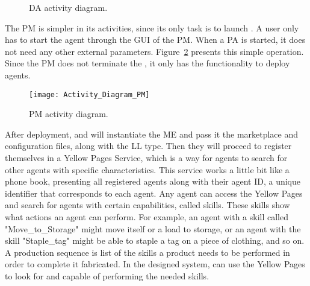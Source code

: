 \begin{figure}[h!]
	\centering
	\hspace{0.40cm}
	\caption{\acrlong{DA} activity diagram.}
	\label{fig:da_activity_diagrams}
\end{figure}

The \acrlong{PM} is simpler in its activities, since its only task is to launch . A user only has to start the agent through the \acrshort{GUI} of the \acrshort{PM}. When a \acrshort{PA} is started, it does not need any other external parameters. Figure~\ref{fig:pm_activity_diagram} presents this simple operation. Since the \acrshort{PM} does not terminate the , it only has the functionality to deploy agents.\\

\begin{figure}[h!]
	\centering
	\texttt{[image: Activity\_Diagram\_PM]}
	\caption{\acrlong{PM} activity diagram.}
	\label{fig:pm_activity_diagram}
\end{figure}

After deployment,  and  will instantiate the \acrlong{ME} and pass it the marketplace and configuration files, along with the \acrshort{LL} type. Then they will proceed to register themselves in a Yellow Pages Service, which is a way for agents to search for other agents with specific characteristics. This service works a little bit like a phone book, presenting all registered agents along with their agent ID, a unique identifier that corresponds to each agent. Any agent can access the Yellow Pages and search for agents with certain capabilities, called skills. These skills show what actions an agent can perform. For example, an agent with a skill called "Move\_to\_Storage" might move itself or a load to storage, or an agent with the skill "Staple\_tag" might be able to staple a tag on a piece of clothing, and so on. A production sequence is list of the skills a product needs to be performed in order to complete it fabricated. In the designed system,  can use the Yellow Pages to look for  and  capable of performing the needed skills.\\

